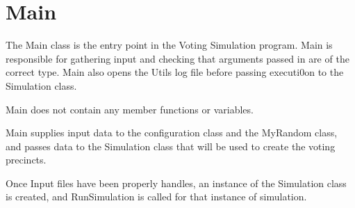 %

\chapter{Main}
The Main class is the entry point in the Voting Simulation program.
Main is responsible for gathering input and checking that arguments passed in are of the correct type.  Main also opens the Utils log file before passing executi0on to the Simulation class.

Main does not contain any member functions or variables.

Main supplies input data to the configuration class and the MyRandom class, and passes data to the Simulation class that will be used to create the voting precincts.

Once Input files have been properly handles, an instance of the Simulation class is created, and RunSimulation is called for that instance of simulation.



